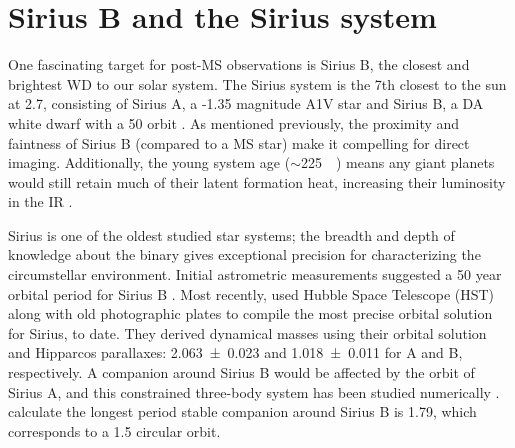 \documentclass[twocolumn]{aastex631}
\begin{document}

\section{Sirius B and the Sirius system}\label{sec:sirius}

One fascinating target for post-MS observations is Sirius B, the closest and brightest WD to our solar system. The Sirius system is the 7th closest to the sun at \qty{2.7}{\parsec}, consisting of Sirius A, a -1.35 magnitude A1V star and Sirius B, a DA white dwarf with a \qty{50}{\year} orbit \citep{collaborationGaiaMission2016, bondSiriusSystemIts2017,collaborationGaiaEarlyData2021a}. As mentioned previously, the proximity and faintness of Sirius B (compared to a MS star) make it compelling for direct imaging. Additionally, the young system age ($\sim$\qty{225}{\mega\year}) means any giant planets would still retain much of their latent formation heat, increasing their luminosity in the IR \citep{fortneyGiantPlanetInterior2010}.

Sirius is one of the oldest studied star systems; the breadth and depth of knowledge about the binary gives exceptional precision for characterizing the circumstellar environment. Initial astrometric measurements suggested a 50 year orbital period for Sirius B \citep{auwersOrbitSirius1864}. Most recently, \citet{bondSiriusSystemIts2017} used Hubble Space Telescope (HST) along with old photographic plates to compile the most precise orbital solution for Sirius, to date. They derived dynamical masses using their orbital solution and Hipparcos parallaxes: \qty{2.063+-0.023}{\solarmass} and \qty{1.018+-0.011}{\solarmass} for A and B, respectively. A companion around Sirius B would be affected by the orbit of Sirius A, and this constrained three-body system has been studied numerically \citep{holmanLongTermStabilityPlanets1999}. \citet{bondSiriusSystemIts2017} calculate the longest period stable companion around Sirius B is \qty{1.79}{\year}, which corresponds to a \qty{1.5}{\au} circular orbit.
\end{document}
